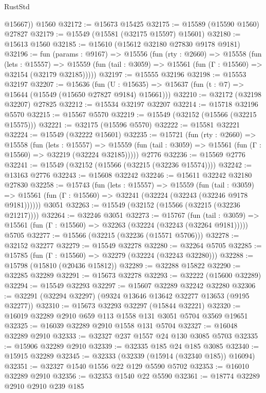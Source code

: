 \begin{lexlean}{RustStd}
\begin{coremodule}
        @15667))
    @1560
@32172 := @15673 @15425
@32175 := @15589 (@15590 @1560) @27827
@32179 := @15549 (@15581 (@32175 @15597) @15601)
@32180 := @15613 @1560
@32185 := @15610 (@15612 @32180 @27830 @9178 @9181)
@32196 := fun (params : @9167) =>
  @15556
    (fun (rty : @2660) =>
    @15558
      (fun (lets : @15557) =>
      @15559 (fun (tail : @3059) => @15561 (fun (Γ : @15560) => @32154 (@32179 @32185)))))
@32197 := @15555 @32196
@32198 := @15553 @32197
@32207 := @15636
    (fun (U : @15635) => @15637 (fun (t : @7) => @15644 (@15549 (@15650 @27827 @9184) @15661)))
@32210 := @32172 (@32198 @32207) @27825
@32212 := @15534 @32197 @32207
@32214 := @15718 @32196 @5570
@32215 := @15567 @5570
@32219 := @15549 (@32152 (@15566 (@32215 @15575)))
@32221 := @32175 (@15596 @5570)
@32222 := @15581 @32221
@32224 := @15549 (@32222 @15601)
@32235 := @15721
    (fun (rty : @2660) =>
    @15558
      (fun (lets : @15557) =>
      @15559 (fun (tail : @3059) => @15561 (fun (Γ : @15560) => @32219 (@32224 @32185)))))
    @2776
@32236 := @15569 @2776
@32241 := @15549 (@32152 (@15566 (@32215 (@32236 @15574))))
@32242 := @13163 @2776
@32243 := @15608 @32242
@32246 := @15611 @32242 @32180 @27830
@32258 := @15743
    (fun (lets : @15557) =>
    @15559
      (fun (tail : @3059) =>
      @15561 (fun (Γ : @15560) => @32241 (@32224 (@32243 (@32246 @9178 @9181))))))
    @3051
@32263 := @15549 (@32152 (@15566 (@32215 (@32236 @21217))))
@32264 := @32246 @3051
@32273 := @15767
    (fun (tail : @3059) => @15561 (fun (Γ : @15560) => @32263 (@32224 (@32243 (@32264 @9181)))))
    @5705
@32277 := @15566 (@32215 (@32236 (@15571 @5706)))
@32278 := @32152 @32277
@32279 := @15549 @32278
@32280 := @32264 @5705
@32285 := @15785 (fun (Γ : @15560) => @32279 (@32224 (@32243 @32280)))
@32288 := @15798 (@15810 (@20436 @15812))
@32289 := @32288 @15822
@32290 := @32285 @32289
@32291 := @15673 @32278
@32293 := @32222 (@15600 @32289)
@32294 := @15549 @32293
@32297 := @15607 @32289 @32242 @32280
@32306 := @32291 (@32294 @32297) (@9324 @13646 @13642 @32277 @13653 (@9195 @32277))
@32310 := @15673 @32293 @32297 (@15844 @32221)
@32320 := @16019 @32289 @2910 @659 @113 @1558 @131 @3051 @5704 @3569 @19651
@32325 := @16039 @32289 @2910 @1558 @131 @5704
@32327 := @16048 @32289 @2910
@32333 := @32327 @237 @1557 @24 @130 @3085 @5703
@32335 := @15906 @32289 @2910
@32339 := @32335 @185 @24 @185 @3085
@32340 := @15915 @32289
@32345 := @32333 (@32339 (@15914 (@32340 @185)) @16094)
@32351 := @32327 @1540 @1556 @22 @129 @5590 @5702
@32353 := @16010 @32289 @2910
@32356 := @32353 @1540 @22 @5590
@32361 := @18774 @32289 @2910 @2910 @239 @185

\end{coremodule}
\end{lexlean}
